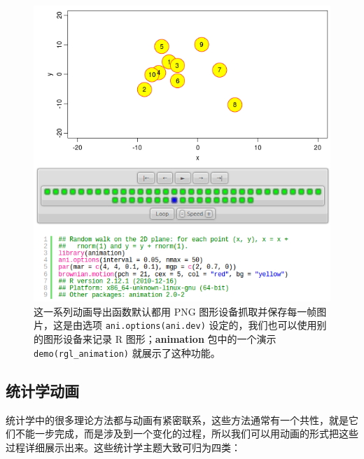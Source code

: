 \documentclass[
  b5paper,
  UTF8,twoside]{book}
\begin{document}
\begin{figure}

{\centering \includegraphics{images/html-interface} 

}

\caption[HTML 页面内的动画界面]{这一系列动画导出函数默认都用 PNG 图形设备抓取并保存每一帧图片，这是由选项 \texttt{ani.options(\textquotesingle{}ani.dev\textquotesingle{})} 设定的，我们也可以使用别的图形设备来记录 R 图形；\textbf{animation} 包中的一个演示 \texttt{demo(\textquotesingle{}rgl\_animation\textquotesingle{})} 就展示了这种功能。}\label{fig:html-interface}
\end{figure}



\hypertarget{ux7edfux8ba1ux5b66ux52a8ux753b}{%
\subsection{统计学动画}\label{ux7edfux8ba1ux5b66ux52a8ux753b}}

统计学中的很多理论方法都与动画有紧密联系，这些方法通常有一个共性，就是它们不能一步完成，而是涉及到一个变化的过程，所以我们可以用动画的形式把这些过程详细展示出来。这些统计学主题大致可归为四类：
\end{document}
